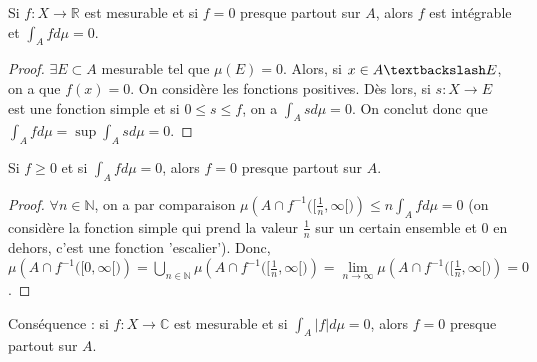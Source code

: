\begin{theo}
    Si $f:X\to\mathbb{R}$ est mesurable et si $f=0$ presque partout sur $A$, alors $f$ est intégrable et $\int_Afd\mu=0$.
\end{theo}
\begin{proof}
    $\exists E\subset A$ mesurable tel que $\mu(E)=0$. Alors, si $x\in A\textbackslash E$, on a que $f(x)=0$. On considère les fonctions positives. Dès lors, si $s:X\to E$ est une fonction simple et si $0\leq s\leq f$, on a $\int_A sd\mu=0$. On conclut donc que $\int_Afd\mu= \sup \int_A sd\mu=0$.
\end{proof}

\begin{theo}
    Si $f\geq0$ et si $\int_Afd\mu=0$, alors $f=0$ presque partout sur $A$.
\end{theo}
\begin{proof}
    $\forall n\in\mathbb{N}$, on a par comparaison $\mu\left(A\cap f^{-1}\big([\frac{1}{n},\infty[\big)\right)\leq n\int_Afd\mu=0$ (on considère la fonction simple qui prend la valeur $\frac{1}{n}$ sur un certain ensemble et $0$ en dehors, c'est une fonction 'escalier'). Donc, $\mu\left(A\cap f^{-1}\big([0,\infty[\big)\right)=\bigcup\limits_{n\in\mathbb{N}}\mu\left(A\cap f^{-1}\big([\frac{1}{n},\infty[\big)\right)=\lim\limits_{n\to\infty}\mu\left(A\cap f^{-1}\big([\frac{1}{n},\infty[\big)\right) = 0$.
\end{proof}

Conséquence : si $f:X\to\mathbb{C}$ est mesurable et si $\int_A|f|d\mu=0$, alors $f=0$ presque partout sur $A$.


